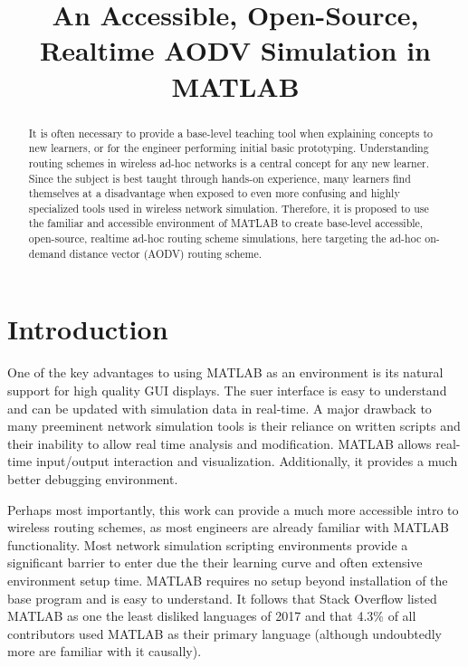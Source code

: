 \documentclass[conference]{IEEEtran}
\begin{document}
\title{An Accessible, Open-Source, Realtime AODV Simulation in MATLAB}
\author{
}

\maketitle

\begin{flushright}\end{flushright}
\begin{abstract}
It is often necessary to provide a base-level teaching tool when explaining concepts to new learners, or for the engineer performing initial basic prototyping. Understanding routing schemes in wireless ad-hoc networks is a central concept for any new learner. Since the subject is best taught through hands-on experience, many learners find themselves at a disadvantage when exposed to even more confusing and highly specialized tools used in wireless network simulation. Therefore, it is proposed to use the familiar and accessible environment of MATLAB to create base-level accessible, open-source, realtime ad-hoc routing scheme simulations, here targeting the ad-hoc on-demand distance vector  (AODV) routing scheme.
\end{abstract}

\section{Introduction}
One of the key advantages to using MATLAB as an environment is its natural support for high quality GUI displays. The suer interface is easy to understand and can be updated with simulation data in real-time. A major drawback to many preeminent network simulation tools is their reliance on written scripts and their inability to allow real time analysis and modification. MATLAB allows real-time input/output interaction and visualization. Additionally, it provides a much better debugging environment.

Perhaps most importantly, this work can provide a much more accessible intro to wireless routing schemes, as most engineers are already familiar with MATLAB functionality. Most network simulation scripting environments provide a significant barrier to enter due the their learning curve and often extensive environment setup time. MATLAB requires no setup beyond installation of the base program and is easy to understand. It follows that Stack Overflow listed MATLAB as one the least disliked languages of 2017 \cite{stack_overflow_disliked} and that 4.3\% of all contributors used MATLAB as their primary language \cite{stack_overflow_popularity} (although undoubtedly more are familiar with it causally).
\end{document}
